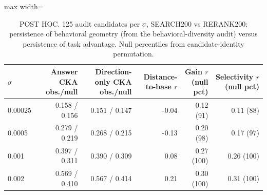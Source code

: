 \begin{table}[t]
\centering
\small
\begin{adjustbox}{max width=\linewidth}
\begin{tabular}{lrrrrr}
\toprule
$\sigma$ & Answer CKA obs./null & Direction-only CKA obs./null & Distance-to-base $r$ & Gain $r$ (null pct) & Selectivity $r$ (null pct) \\
\midrule
0.00025 & 0.158 / 0.156 & 0.151 / 0.147 & -0.04 & 0.12 (91) & 0.11 (88) \\
0.0005 & 0.279 / 0.219 & 0.268 / 0.215 & -0.13 & 0.20 (98) & 0.17 (97) \\
0.001 & 0.397 / 0.311 & 0.390 / 0.309 & 0.08 & 0.27 (100) & 0.26 (100) \\
0.002 & 0.569 / 0.410 & 0.567 / 0.414 & 0.21 & 0.30 (100) & 0.31 (100) \\
\bottomrule
\end{tabular}
\end{adjustbox}
\caption{POST HOC. 125 audit candidates per $\sigma$, SEARCH200 vs RERANK200: persistence of behavioral geometry (from the behavioral-diversity audit) versus persistence of task advantage. Null percentiles from candidate-identity permutation.}
\label{tab:behavior-vs-task}
\end{table}
